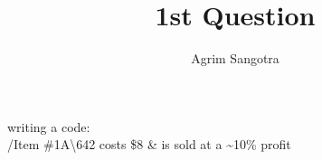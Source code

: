 \documentclass{article}
\title{1st Question}
\author{Agrim Sangotra}
\date{}
\begin{document}
\maketitle
writing a code:\\
/Item \#1A\textbackslash642 costs \$8 \& is sold at a \~{}10\% profit 
\end{document}
